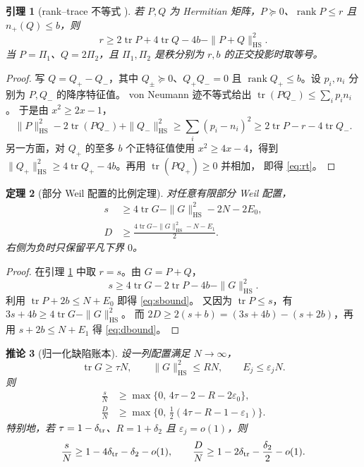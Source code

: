 \documentclass[UTF8,11pt,a4paper]{ctexart}
\newtheorem{theorem}{定理}[section]
\newtheorem{lemma}[theorem]{引理}
\newtheorem{corollary}[theorem]{推论}
\theoremstyle{definition}
\theoremstyle{remark}
\newcommand{\tr}{\operatorname{tr}}
\newcommand{\rank}{\operatorname{rank}}
\newcommand{\HS}{\mathrm{HS}}
\newcommand{\eps}{\varepsilon}
\begin{document}
\begin{lemma}[rank--trace 不等式 {\cite[Lemma 3.2]{AF26}}]\label{lem:rt}
若 $P,Q$ 为 Hermitian 矩阵，$P\succeq0$、$\rank P\le r$ 且
$n_+(Q)\le b$，则
\begin{equation}\label{eq:rt}
 r\ge 2\tr P+4\tr Q-4b-\|P+Q\|_{\HS}^2.
\end{equation}
当 $P=\Pi_1$、$Q=2\Pi_2$，且 $\Pi_1,\Pi_2$ 是秩分别为 $r,b$
的正交投影时取等号。
\end{lemma}

\begin{proof}
写 $Q=Q_+-Q_-$，其中 $Q_\pm\succeq0$、$Q_+Q_-=0$ 且
$\rank Q_+\le b$。设 $p_i,n_i$ 分别为 $P,Q_-$ 的降序特征值。
von Neumann 迹不等式给出 $\tr(PQ_-)\le\sum_i p_i n_i$。
于是由 $x^2\ge2x-1$，
\[
 \|P\|_{\HS}^2-2\tr(PQ_-)+\|Q_-\|_{\HS}^2
 \ge \sum_i(p_i-n_i)^2
 \ge 2\tr P-r-4\tr Q_-.
\]
另一方面，对 $Q_+$ 的至多 $b$ 个正特征值使用 $x^2\ge4x-4$，得到
$\|Q_+\|_{\HS}^2\ge4\tr Q_+-4b$。再用 $\tr(PQ_+)\ge0$ 并相加，
即得 \eqref{eq:rt}。
\end{proof}

\begin{theorem}[部分 Weil 配置的比例定理]\label{thm:partial}
对任意有限部分 Weil 配置，
\begin{align}
 s&\ge4\tr G-\|G\|_{\HS}^2-2N-2E_0, \label{eq:sbound}\\
 D&\ge\frac{4\tr G-\|G\|_{\HS}^2-N-E_1}{2}. \label{eq:dbound}
\end{align}
右侧为负时只保留平凡下界 $0$。
\end{theorem}

\begin{proof}
在引理 \ref{lem:rt} 中取 $r=s$。由 $G=P+Q$，
\[
 s\ge4\tr G-2\tr P-4b-\|G\|_{\HS}^2.
\]
利用 $\tr P+2b\le N+E_0$ 即得 \eqref{eq:sbound}。
又因为 $\tr P\le s$，有 $3s+4b\ge4\tr G-\|G\|_{\HS}^2$。
而 $2D\ge2(s+b)=(3s+4b)-(s+2b)$，再用
$s+2b\le N+E_1$ 得 \eqref{eq:dbound}。
\end{proof}

\begin{corollary}[归一化缺陷账本]\label{cor:defect}
设一列配置满足 $N\to\infty$，
\[
 \tr G\ge\tau N,\qquad \|G\|_{\HS}^2\le RN,\qquad E_j\le\eps_jN.
\]
则
\begin{align}
 \frac{s}{N}&\ge\max\{0,\,4\tau-2-R-2\eps_0\}, \label{eq:norms}\\
 \frac{D}{N}&\ge\max\{0,\,\tfrac12(4\tau-R-1-\eps_1)\}. \label{eq:normd}
\end{align}
特别地，若 $\tau=1-\delta_{\rm tr}$、$R=1+\delta_2$ 且
$\eps_j=o(1)$，则
\[
 \frac{s}{N}\ge1-4\delta_{\rm tr}-\delta_2-o(1),\qquad
 \frac{D}{N}\ge1-2\delta_{\rm tr}-\frac{\delta_2}{2}-o(1).
\]
\end{corollary}
\end{document}
